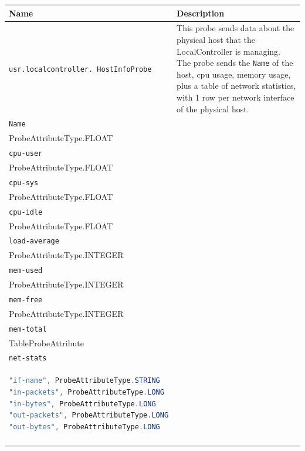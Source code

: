 {
  \small

  \begin{longtable}{ | p{5.7cm} | p{8.7cm} | }

\hline
\textbf{Name} & \textbf{Description} \\
\hline
\texttt{usr.localcontroller. HostInfoProbe} & This probe sends data
about the physical host that the LocalController is managing. \newline
The probe sends the \texttt{Name} of the host, cpu usage, memory usage,
plus a table of network statistics, with 1 row per network interface
of the physical host.

\vspace{\baselineskip}
\begin{tabular}{ p{8.3cm} }
  \hline
  ProbeAttributeType.STRING \\
  \hline
  \texttt{Name} \\
  \hline
  ProbeAttributeType.FLOAT \\
  \hline
  \texttt{cpu-user} \\
  \hline
  ProbeAttributeType.FLOAT \\
  \hline
  \texttt{cpu-sys} \\
  \hline
  ProbeAttributeType.FLOAT \\
  \hline
  \texttt{cpu-idle} \\
  \hline
  ProbeAttributeType.FLOAT \\
  \hline
  \texttt{load-average} \\
  \hline
  ProbeAttributeType.INTEGER \\
  \hline
  \texttt{mem-used} \\
  \hline
  ProbeAttributeType.INTEGER \\
  \hline
  \texttt{mem-free} \\
  \hline
  ProbeAttributeType.INTEGER \\
  \hline
  \texttt{mem-total} \\
  \hline
  TableProbeAttribute \\
  \hline
  \texttt{net-stats} \\
  \hline
\begin{lstlisting}[language=java]
"if-name", ProbeAttributeType.STRING
"in-packets", ProbeAttributeType.LONG
"in-bytes", ProbeAttributeType.LONG
"out-packets", ProbeAttributeType.LONG
"out-bytes", ProbeAttributeType.LONG
\end{lstlisting} \\
  \hline
\end{tabular}

\\
\hline
  \end{longtable}

 
\normalsize
}

